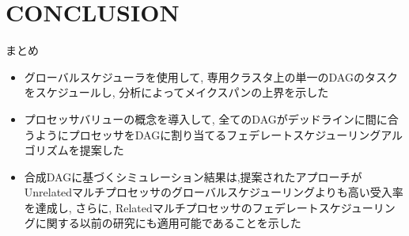 
\section{CONCLUSION}
\label{sec: CONCLUSION}

\begin{frame}{まとめ}
    \begin{itemize}
        \item グローバルスケジューラを使用して, 専用クラスタ上の単一のDAGのタスクをスケジュールし, 分析によってメイクスパンの上界を示した

        \item プロセッサバリューの概念を導入して, 全てのDAGがデッドラインに間に合うようにプロセッサをDAGに割り当てるフェデレートスケジューリングアルゴリズムを提案した

        \item 合成DAGに基づくシミュレーション結果は,提案されたアプローチがUnrelatedマルチプロセッサのグローバルスケジューリングよりも高い受入率を達成し, さらに, Relatedマルチプロセッサのフェデレートスケジューリングに関する以前の研究にも適用可能であることを示した
    \end{itemize}
\end{frame}
